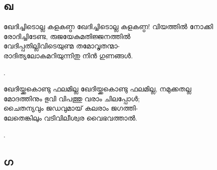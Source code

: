 \subsection{ഖ}

\begin{enumerate}

\begin{slokam}{\VVt}{\KA}{ഖേദിച്ചിടൊല്ല കളകണ്ഠ}
ഖേദിച്ചിടൊല്ല കളകണ്ഠ! വിയത്തില്‍ നോക്കി\\
രോദിച്ചിടേണ്ട, രുജയേകുമതിജ്ജനത്തില്‍\\
വേദിപ്പതില്ലിവിടെയുണ്മ തമോവൃതന്മാ-\\
രാദിത്യലോകമറിയുന്നിതു നിന്‍ ഗുണങ്ങള്‍.
\end{slokam}


.

\begin{slokam}{\VVt}{\KA}{ഖേദിയ്ക്കകൊണ്ടു ഫലമില്ല}
ഖേദിയ്ക്കകൊണ്ടു ഫലമില്ല, നമുക്കതല്ല\\
മോദത്തിനും ഭുവി വിപത്തു വരാം ചിലപ്പോള്‍;\\
ചൈതന്യവും ജഡവുമായ്‌ കലരാം ജഗത്തി-\\
ലേതെങ്കിലും വടിവിലീശ്വര വൈഭവത്താല്‍.
\end{slokam}


.

\end{enumerate}

\subsection{ഗ}

